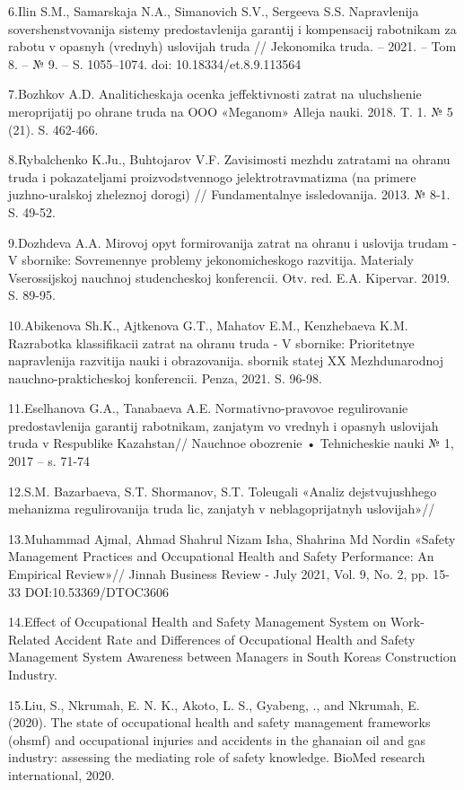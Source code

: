 6.Il\textquotesingle in S.M., Samarskaja N.A., Simanovich S.V., Sergeeva
S.S. Napravlenija sovershenstvovanija sistemy predostavlenija garantij i
kompensacij rabotnikam za rabotu v opasnyh (vrednyh) uslovijah truda //
Jekonomika truda. -- 2021. -- Tom 8. -- № 9. -- S. 1055--1074. doi:
10.18334/et.8.9.113564

7.Bozhkov A.D. Analiticheskaja ocenka jeffektivnosti zatrat na
uluchshenie meroprijatij po ohrane truda na OOO «Meganom» Alleja nauki.
2018. T. 1. № 5 (21). S. 462-466.

8.Rybalchenko K.Ju., Buhtojarov V.F. Zavisimosti mezhdu zatratami na
ohranu truda i pokazateljami proizvodstvennogo jelektrotravmatizma (na
primere juzhno-ural\textquotesingle skoj zheleznoj dorogi) //
Fundamental\textquotesingle nye issledovanija. 2013. № 8-1. S. 49-52.

9.Dozhdeva A.A. Mirovoj opyt formirovanija zatrat na ohranu i uslovija
trudam - V sbornike: Sovremennye problemy jekonomicheskogo razvitija.
Materialy Vserossijskoj nauchnoj studencheskoj konferencii. Otv. red.
E.A. Kipervar. 2019. S. 89-95.

10.Abikenova Sh.K., Ajtkenova G.T., Mahatov E.M., Kenzhebaeva K.M.
Razrabotka klassifikacii zatrat na ohranu truda - V sbornike:
Prioritetnye napravlenija razvitija nauki i obrazovanija. sbornik statej
XX Mezhdunarodnoj nauchno-prakticheskoj konferencii. Penza, 2021. S.
96-98.

11.Eselhanova G.A., Tanabaeva A.E. Normativno-pravovoe regulirovanie
predostavlenija garantij rabotnikam, zanjatym vo vrednyh i opasnyh
uslovijah truda v Respublike Kazahstan// Nauchnoe obozrenie •
Tehnicheskie nauki № 1, 2017 -- s. 71-74

12.S.M. Bazarbaeva, S.T. Shormanov, S.T. Toleugali «Analiz
dejstvujushhego mehanizma regulirovanija truda lic, zanjatyh v
neblagoprijatnyh uslovijah»//

13.Muhammad Ajmal, Ahmad Shahrul Nizam Isha, Shahrina Md Nordin «Safety
Management Practices and Occupational Health and Safety Performance: An
Empirical Review»// Jinnah Business Review - July 2021, Vol. 9, No. 2,
pp. 15-33 DOI:10.53369/DTOC3606

14.Effect of Occupational Health and Safety Management System on
Work-Related Accident Rate and Differences of Occupational Health and
Safety Management System Awareness between Managers in South
Korea\textquotesingle s Construction Industry.

15.Liu, S., Nkrumah, E. N. K., Akoto, L. S., Gyabeng, ., and Nkrumah, E.
(2020). The state of occupational health and safety management
frameworks (ohsmf) and occupational injuries and accidents in the
ghanaian oil and gas industry: assessing the mediating role of safety
knowledge. BioMed research international, 2020.

